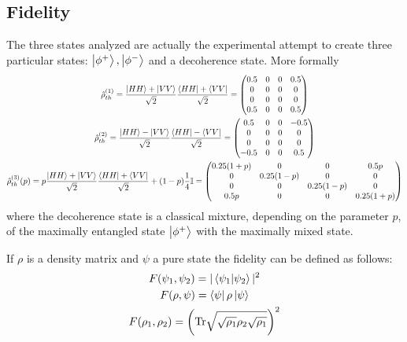 \documentclass[a4paper, 11pt]{article}
\begin{document}
      \subsection{Fidelity}
        The three states analyzed are actually the experimental attempt to create three particular states: $\ket{\phi^+}, \ket{\phi^-}$ and a decoherence state. More formally
        \begin{gather*}
          \hat{\rho}^{(1)}_{th} = \frac{\ket{HH} + \ket{VV}}{\sqrt{2}}\frac{\bra{HH} + \bra{VV}}{\sqrt{2}} =
          \begin{pmatrix}
            0.5 & 0 & 0 & 0.5 \\
            0 & 0 & 0 & 0 \\
            0 & 0 & 0 & 0 \\
            0.5 & 0 & 0 & 0.5
          \end{pmatrix} \\
          \hat{\rho}^{(2)}_{th} = \frac{\ket{HH} - \ket{VV}}{\sqrt{2}}\frac{\bra{HH} - \bra{VV}}{\sqrt{2}} =
          \begin{pmatrix}
            0.5 & 0 & 0 & -0.5 \\
            0 & 0 & 0 & 0 \\
            0 & 0 & 0 & 0 \\
            -0.5 & 0 & 0 & 0.5
          \end{pmatrix} \\
          \hat{\rho}^{(3)}_{th}(p) = p\frac{\ket{HH} + \ket{VV}}{\sqrt{2}}\frac{\bra{HH} + \bra{VV}}{\sqrt{2}} + (1 - p)\frac{1}{4}\mathbb{I} =
          \begin{pmatrix}
            0.25(1+p) & 0 & 0 & 0.5p \\
            0 & 0.25(1-p) & 0 & 0 \\
            0 & 0 & 0.25(1-p) & 0 \\
            0.5p & 0 & 0 & 0.25(1+p)
          \end{pmatrix}
        \end{gather*}
        where the decoherence state is a classical mixture, depending on the parameter $p$, of the maximally entangled state $\ket{\phi^+}$ with the maximally mixed state.

        If $\rho$ is a density matrix and $\psi$ a pure state the fidelity can be defined as follows:
        \begin{gather*}
          F(\psi_1, \psi_2) = |\braket{\psi_1}{\psi_2}|^2 \\
          F(\rho,\psi) = \bra{\psi}\rho\ket{\psi} \\
          F(\rho_1,\rho_2) = \left(\text{Tr}\sqrt{\sqrt{\rho_1}\rho_2\sqrt{\rho_1}} \right)^2
        \end{gather*}
\end{document}
